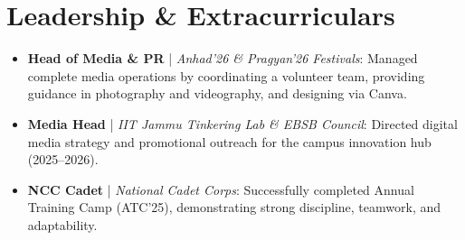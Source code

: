 \documentclass[letterpaper,11pt]{article}
\newcommand{\resumeItem}[1]{
  \item\small{
    {#1 \vspace{-2pt}}
  }
}
\newcommand{\resumeItemListStart}{\begin{itemize}[itemsep=0pt, parseitemsep=0pt]}
\newcommand{\resumeItemListEnd}{\end{itemize}\vspace{-6pt}}
\begin{document}
\section*{Leadership \& Extracurriculars}
  \resumeItemListStart
    \resumeItem{\textbf{Head of Media \& PR} | \textit{Anhad'26 \& Pragyan'26 Festivals}: Managed complete media operations by coordinating a volunteer team, providing guidance in photography and videography, and designing via Canva.}
    \resumeItem{\textbf{Media Head} | \textit{IIT Jammu Tinkering Lab \& EBSB Council}: Directed digital media strategy and promotional outreach for the campus innovation hub (2025--2026).}
    \resumeItem{\textbf{NCC Cadet} | \textit{National Cadet Corps}: Successfully completed Annual Training Camp (ATC'25), demonstrating strong discipline, teamwork, and adaptability.}
  \resumeItemListEnd
\end{document}
